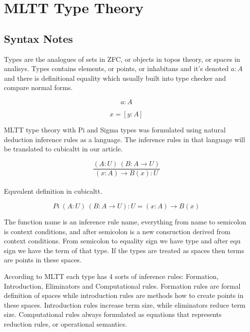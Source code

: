 \documentclass{svproc}
\begin{document}
\section{MLTT Type Theory}

\subsection{Syntax Notes}

Types are the analogues of sets in ZFC, or objects in topos theory, or spaces in analisys.
Types contains elements, or points, or inhabitans and it's denoted $a : A$ and there
is definitional equality which usually built into type checker and compare normal forms.

\begin{equation}
\tag{terms and types}
a : A
\end{equation}

\begin{equation}
\tag{definitional equality}
x = [ y : A ]
\end{equation}

MLTT type theory with Pi and Sigma types was formulated using
natural deduction inference rules as a language.
The inference rules in that language will
be translated to cubicaltt in our article.

\begin{equation}
\tag{natural deduction}
\dfrac
{(A: U)\ (B: A \rightarrow U)}
{(x: A) \rightarrow B(x): U}
\end{equation}
\\
Equvalent definition in cubicaltt.

\begin{equation}
\tag{cubicaltt}
Pi\ (A: U)\ (B: A \rightarrow U): U = (x: A) \rightarrow B(x)
\end{equation}

The function name is an inference rule name,
everything from name to semicolon is context conditions,
and after semicolon is a new consruction derived from context conditions.
From semicolon to equality sign we have type and after
equ sign we have the term of that type.
If the types are treated as spaces then terms are points in these spaces.

According to MLTT each type has 4 sorts of inference rules:
Formation, Introduction, Eliminators and Computational rules.
Formation rules are formal definition of spaces while introduction rules
are methods how to create points in these spaces. Introduction rules increase term size,
while eliminators reduce term size. Computational rules always
formulated as equations that represents reduction rules,
or operational semantics.
\end{document}
